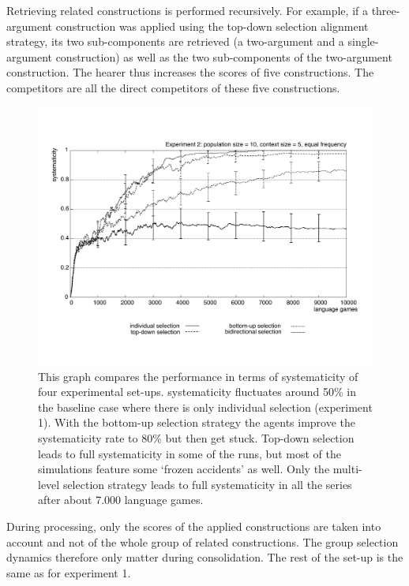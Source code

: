 Retrieving related constructions is performed recursively. For example, if a three-argument construction was applied using the top-down selection alignment strategy, its two sub-components are retrieved (a two-argument and a single-argument construction) as well as the two sub-components of the two-argument construction. The hearer thus increases the scores of five constructions. The competitors are all the direct competitors of these five constructions.
\begin{figure}[p]
\centerline{\includegraphics[width=\textwidth]{Chapter4/figs/systematicity-vs-2}}
  \caption[Experiment 2: systematicity]{This graph compares the performance in terms of systematicity of four experimental set-ups. systematicity fluctuates around 50\% in the baseline case where there is only individual selection (experiment 1). With the bottom-up selection strategy the agents improve the systematicity rate to 80\% but then get stuck. Top-down selection leads to full systematicity in some of the runs, but most of the simulations feature some `frozen accidents' as well. Only the multi-level selection strategy leads to full systematicity in all the series after about 7.000 language games.}
   \label{f:systematicity2}
\end{figure}

During processing, only the scores of the applied constructions are taken into account and not of the whole group of related constructions. The group selection dynamics therefore only matter during consolidation. The rest of the set-up is the same as for experiment 1.

